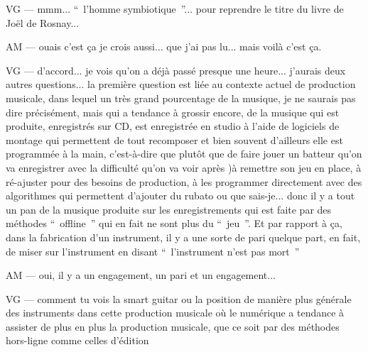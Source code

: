 VG — mmm... “ l'homme symbiotique ”... pour reprendre le titre du livre de Joël de Rosnay... 

AM — ouais c'est ça je crois aussi... que j'ai pas lu... mais voilà c'est ça.

VG — d'accord... je vois qu'on a déjà passé presque une heure... j'aurais deux autres questions... la première question est liée au contexte actuel de production musicale, dans lequel un très grand pourcentage de la musique, je ne saurais pas dire précisément, mais qui a tendance à grossir encore, de la musique qui est produite, enregistrés sur CD, est enregistrée en studio à l'aide de logiciels de montage qui permettent de tout recomposer et bien souvent d'ailleurs elle est programmée à la main, c'est-à-dire que plutôt que de faire jouer un batteur qu'on va enregistrer avec la difficulté qu'on va voir après )à remettre son jeu en place, à ré-ajuster pour des besoins de production, à les programmer directement avec des algorithmes qui permettent d'ajouter du rubato ou que sais-je... donc il y a tout un pan de la musique produite sur les enregistrements qui est faite par des méthodes “ offline ” qui en fait ne sont plus du “ jeu ”.  Et par rapport à ça, dans la fabrication d'un instrument, il y a une sorte de pari quelque part, en fait, de miser sur l'instrument en disant “ l'instrument n'est pas mort ” 

AM — oui, il y a un engagement, un pari et un engagement... 

VG — comment tu vois la smart guitar ou la position de manière plus générale des instruments dans cette production musicale où le numérique a tendance à assister de plus en plus la production musicale, que ce soit par des méthodes hors-ligne comme celles d'édition

